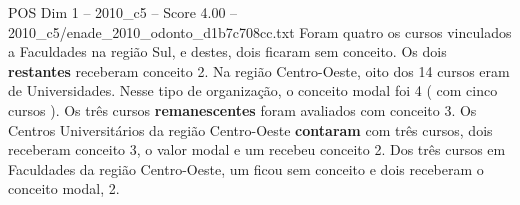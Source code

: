\begin{textsample}{POS Dim 1 – 2010\_c5 – Score 4.00 – 2010\_c5/enade\_2010\_odonto\_d1b7c708cc.txt}
Foram quatro os cursos vinculados a Faculdades na região Sul, e destes, dois ficaram sem conceito.
Os dois \textbf{restantes} receberam conceito 2.
Na região Centro-Oeste, oito dos 14 cursos eram de Universidades.
Nesse tipo de organização, o conceito modal foi 4 ( com cinco cursos ).
Os três cursos \textbf{remanescentes} foram avaliados com conceito 3.
Os Centros Universitários da região Centro-Oeste \textbf{contaram} com três cursos, dois receberam conceito 3, o valor modal e um recebeu conceito 2.
Dos três cursos em Faculdades da região Centro-Oeste, um ficou sem conceito e dois receberam o conceito modal, 2.

\end{textsample}
